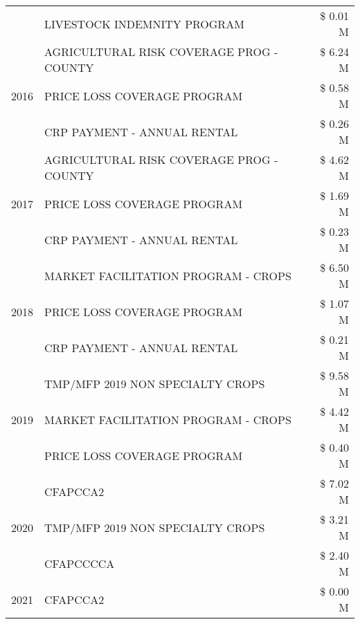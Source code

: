 \begin{tabular}{llr}
 & LIVESTOCK INDEMNITY PROGRAM & \$ 0.01 M \\
\cline{1-3}
\multirow[t]{3}{*}{2016} & AGRICULTURAL RISK COVERAGE PROG - COUNTY      & \$ 6.24 M \\
 & PRICE LOSS COVERAGE PROGRAM                   & \$ 0.58 M \\
 & CRP PAYMENT - ANNUAL RENTAL                   & \$ 0.26 M \\
\cline{1-3}
\multirow[t]{3}{*}{2017} & AGRICULTURAL RISK COVERAGE PROG - COUNTY & \$ 4.62 M \\
 & PRICE LOSS COVERAGE PROGRAM & \$ 1.69 M \\
 & CRP PAYMENT - ANNUAL RENTAL & \$ 0.23 M \\
\cline{1-3}
\multirow[t]{3}{*}{2018} & MARKET FACILITATION PROGRAM - CROPS & \$ 6.50 M \\
 & PRICE LOSS COVERAGE PROGRAM & \$ 1.07 M \\
 & CRP PAYMENT - ANNUAL RENTAL & \$ 0.21 M \\
\cline{1-3}
\multirow[t]{3}{*}{2019} & TMP/MFP 2019 NON SPECIALTY CROPS & \$ 9.58 M \\
 & MARKET FACILITATION PROGRAM - CROPS & \$ 4.42 M \\
 & PRICE LOSS COVERAGE PROGRAM & \$ 0.40 M \\
\cline{1-3}
\multirow[t]{3}{*}{2020} & CFAPCCA2 & \$ 7.02 M \\
 & TMP/MFP 2019 NON SPECIALTY CROPS & \$ 3.21 M \\
 & CFAPCCCCA & \$ 2.40 M \\
\cline{1-3}
2021 & CFAPCCA2 & \$ 0.00 M \\
\cline{1-3}
\bottomrule
\end{tabular}
